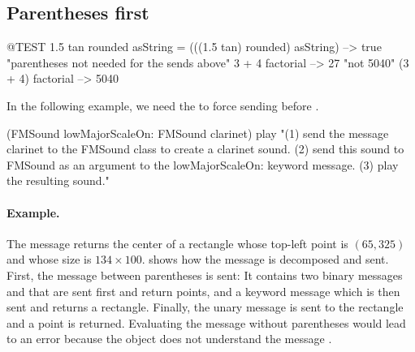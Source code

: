 \documentclass[a4paper,10pt,twoside]{book}
\begin{document}
\subsection{Parentheses first}


\begin{code}{@TEST}
1.5 tan rounded asString = (((1.5 tan) rounded) asString) --> true                                 "parentheses not needed for the sends above"
3 + 4 factorial   --> 27    "not 5040"
(3 + 4) factorial --> 5040
\end{code}

In the following example, we need the  to force sending  before .
\begin{code}{}
(FMSound lowMajorScaleOn: FMSound clarinet) play 
"(1) send the message clarinet to the FMSound class to create a clarinet sound.
 (2) send this sound to FMSound as an argument to the lowMajorScaleOn: keyword message.
 (3) play the resulting sound."
\end{code}



\paragraph{Example.}
The message  returns the center of a rectangle whose top-left point is $(65, 325)$ and whose size is $134{\times}100$.
 shows how the message is decomposed and sent.
First, the message between parentheses is sent:
It contains two binary messages  and  that are sent first and return points, and a keyword message  which is then sent and returns a rectangle.
Finally, the unary message  is sent to the rectangle and a point is returned. 
Evaluating the message without parentheses would lead to an error because the object  does not understand the message .
\end{document}
